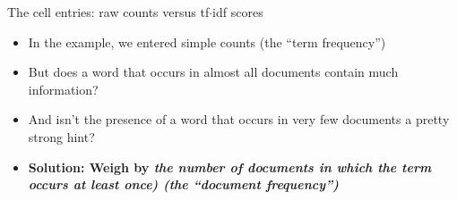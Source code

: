 \documentclass[handout]{beamer}
\begin{document}
\begin{frame}{The cell entries: raw counts versus tf$\cdot$idf scores}
	\begin{itemize}
		\item In the example, we entered simple counts (the ``term frequency'')
		\item But does a word that occurs in almost all documents contain much information?
		\item And isn't the presence of a word that occurs in very few documents a pretty strong hint?
		\item<2-> \textbf{Solution: Weigh by \emph{the number of documents in which the term occurs at least once) (the ``document frequency'')}} 
	\end{itemize}
\end{frame}
\end{document}
